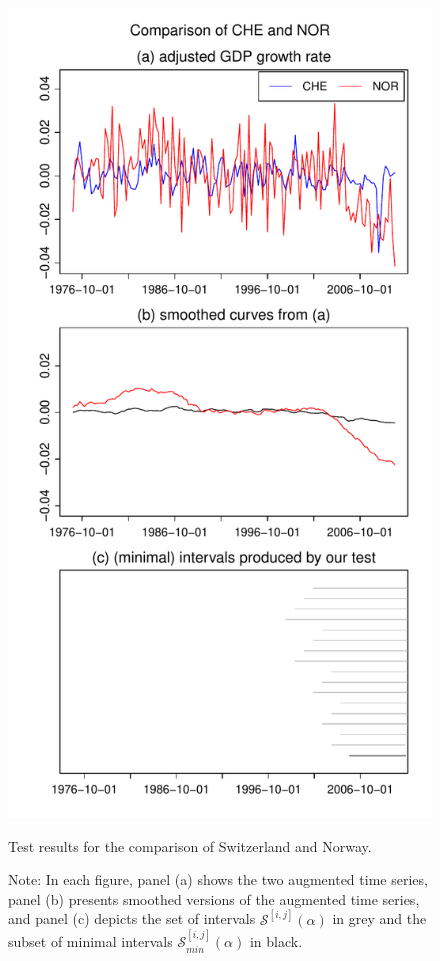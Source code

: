 \documentclass[a4paper,12pt]{article}
\begin{document}
\begin{figure}[t!]
\begin{minipage}[t]{0.49\textwidth}
\includegraphics[width=\textwidth]{Plots/gdp/CHE_vs_NOR}
\caption{Test results for the comparison of Switzerland and Norway.}\label{fig:Switzerland:Norway}
\end{minipage}
\caption*{Note: In each figure, panel (a) shows the two augmented time series, panel (b) presents smoothed versions of the augmented time series, and panel (c) depicts the set of intervals $\mathcal{S}^{[i, j]}(\alpha)$ in grey and the subset of minimal intervals $\mathcal{S}^{[i, j]}_{min}(\alpha)$ in black.}
\end{figure}
\end{document}
